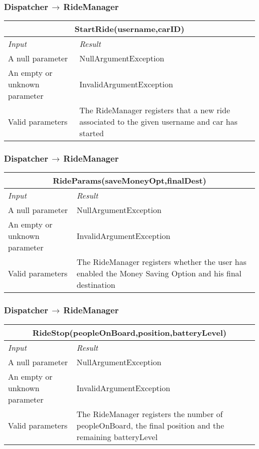 \documentclass[11pt,a4paper]{report}
\begin{document}
\subsubsection{Dispatcher$\,\to\,$RideManager}
\begin{tabularx}{\textwidth}{|X|X|}
	\hline
	\multicolumn{2}{|c|}{\textbf{StartRide(username,carID)}}\\
	\hline
	\textit{Input} & \textit{Result}\\
	\hline
	A null parameter & NullArgumentException\\
	\hline
	An empty or unknown parameter & InvalidArgumentException\\
	\hline
	Valid parameters & The RideManager registers that a new ride associated to the given username and car has started\\
	\hline
\end{tabularx}
\subsubsection{Dispatcher$\,\to\,$RideManager}
\begin{tabularx}{\textwidth}{|X|X|}
	\hline
	\multicolumn{2}{|c|}{\textbf{RideParams(saveMoneyOpt,finalDest)}}\\
	\hline
	\textit{Input} & \textit{Result}\\
	\hline
	A null parameter & NullArgumentException\\
	\hline
	An empty or unknown parameter & InvalidArgumentException\\
	\hline
	Valid parameters & The RideManager registers whether the user has enabled the Money Saving Option and his final destination\\
	\hline
\end{tabularx}
\subsubsection{Dispatcher$\,\to\,$RideManager}
\begin{tabularx}{\textwidth}{|X|X|}
	\hline
	\multicolumn{2}{|c|}{\textbf{RideStop(peopleOnBoard,position,batteryLevel)}}\\
	\hline
	\textit{Input} & \textit{Result}\\
	\hline
	A null parameter & NullArgumentException\\
	\hline
	An empty or unknown parameter & InvalidArgumentException\\
	\hline
	Valid parameters & The RideManager registers the number of peopleOnBoard, the final position and the remaining batteryLevel\\
	\hline
\end{tabularx}
\end{document}
